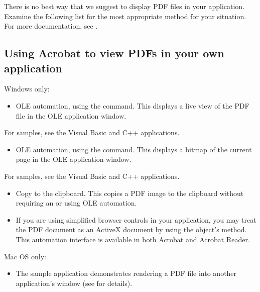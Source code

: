 \documentclass[letterpaper,12pt,english,openany,oneside]{sphinxmanual}
\begin{document}
There is no best way that we suggest to display PDF files in your application. Examine the following list for the most appropriate method for your situation. For more documentation, see  .




\subsection{Using Acrobat to view PDFs in your own application}
\label{\detokenize{apxDevFAQ:using-acrobat-to-view-pdfs-in-your-own-application}}
Windows only:
\begin{itemize}
\item {} 
OLE automation, using the  command. This displays a live view of the PDF file in the OLE application window.

\end{itemize}

For samples, see the Visual Basic and C++  applications.
\begin{itemize}
\item {} 
OLE automation, using the  command. This displays a bitmap of the current page in the OLE application window.

\end{itemize}

For samples, see the Visual Basic and C++  applications.
\begin{itemize}
\item {} 
Copy to the clipboard. This copies a PDF image to the clipboard without requiring an  or  using OLE automation.

\item {} 
If you are using simplified browser controls in your application, you may treat the PDF document as an ActiveX document by using the  object’s  method. This automation interface is available in both Acrobat and Acrobat Reader.

\end{itemize}

Mac OS only:
\begin{itemize}
\item {} 
The  sample application demonstrates rendering a PDF file into another application’s window (see  for details).

\end{itemize}
\end{document}
